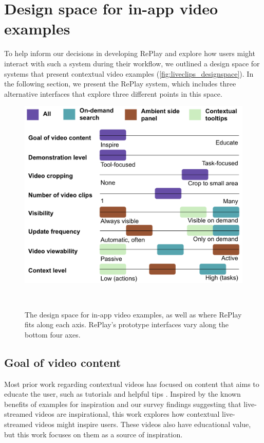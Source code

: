 \section{Design space for in-app video examples}
To help inform our decisions in developing RePlay and explore how users might interact with such a system during their workflow, we outlined a design space for systems that present contextual video examples (\autoref{fig:liveclips_designspace}). In the following section, we present the RePlay system, which includes three alternative interfaces that explore three different points in this space.

\begin{figure}[b!]
\centering
  \includegraphics[width=\columnwidth]{liveclips/figures/designspace.png}
  \caption{The design space for in-app video examples, as well as where RePlay fits along each axis. RePlay's prototype interfaces vary along the bottom four axes. }~\label{fig:liveclips_designspace}
\end{figure}

\subsection{Goal of video content}
Most prior work regarding contextual videos has focused on content that aims to educate the user, such as tutorials \cite{Pongnumkul2011} and helpful tips \cite{Grossman2010a}. Inspired by the known benefits of examples for inspiration \cite{Kulkarni} and our survey findings suggesting that live-streamed videos are inspirational, this work explores how contextual live-streamed videos might inspire users. These videos also have educational value, but this work focuses on them as a source of inspiration. 


